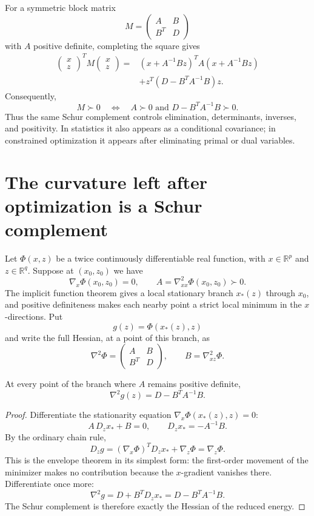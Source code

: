 For a symmetric block matrix
\[
  M=\begin{pmatrix}A&B\\B^T&D\end{pmatrix}
\]
with \(A\) positive definite, completing the square gives
\[
\begin{aligned}
\begin{pmatrix}x\\z\end{pmatrix}^{T}
M
\begin{pmatrix}x\\z\end{pmatrix}
={}&
(x+A^{-1}Bz)^TA(x+A^{-1}Bz)\\
&+z^T(D-B^TA^{-1}B)z.
\end{aligned}
\]
Consequently,
\[
  M\succ0
  \quad\Longleftrightarrow\quad
  A\succ0
  \text{ and }
  D-B^TA^{-1}B\succ0.
\]
Thus the same Schur complement controls elimination, determinants, inverses, and positivity.  In statistics it also appears as a conditional covariance; in constrained optimization it appears after eliminating primal or dual variables.

\section{The curvature left after optimization is a Schur complement}

Let $\Phi(x,z)$ be a twice continuously differentiable real function, with $x\in\mathbb R^p$ and $z\in\mathbb R^q$. Suppose at $(x_0,z_0)$ we have
\[
 \nabla_x\Phi(x_0,z_0)=0,\qquad
 A=\nabla_{xx}^2\Phi(x_0,z_0)\succ0.
\]
The implicit function theorem gives a local stationary branch $x_*(z)$ through $x_0$, and positive definiteness makes each nearby point a strict local minimum in the $x$-directions. Put
\[
 g(z)=\Phi(x_*(z),z)
\]
and write the full Hessian, at a point of this branch, as
\[
 \nabla^2\Phi=
 \begin{pmatrix}A&B\\B^T&D\end{pmatrix},
 \qquad B=\nabla^2_{xz}\Phi.
\]

\begin{theorem}
At every point of the branch where $A$ remains positive definite,
\[
 \boxed{\nabla^2g(z)=D-B^TA^{-1}B.}
\]
\end{theorem}

\begin{proof}
Differentiate the stationarity equation $\nabla_x\Phi(x_*(z),z)=0$:
\[
 A\,D_zx_*+B=0,
 \qquad D_zx_*=-A^{-1}B.
\]
By the ordinary chain rule,
\[
 D_zg=(\nabla_x\Phi)^TD_zx_*+\nabla_z\Phi=\nabla_z\Phi.
\]
This is the envelope theorem in its simplest form: the first-order movement of the minimizer makes no contribution because the $x$-gradient vanishes there. Differentiate once more:
\[
 \nabla^2g
 =D+B^TD_zx_*
 =D-B^TA^{-1}B.
\]
The Schur complement is therefore exactly the Hessian of the reduced energy.
\end{proof}

